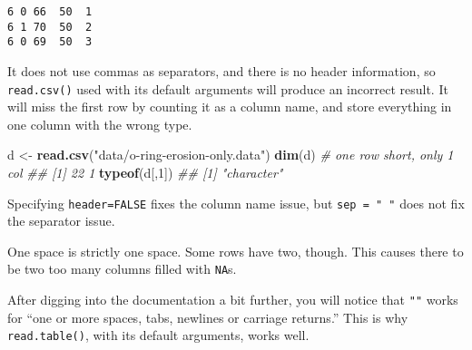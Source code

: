 \documentclass[12pt,krantz2]{krantz}
\makeatletter
\newenvironment{Shaded}{\begin{snugshade}}{\end{snugshade}}
\newcommand{\CommentTok}[1]{\textcolor[rgb]{0.37,0.37,0.37}{\textit{#1}}}
\newcommand{\DataTypeTok}[1]{\textcolor[rgb]{0.27,0.27,0.27}{#1}}
\newcommand{\DecValTok}[1]{\textcolor[rgb]{0.06,0.06,0.06}{#1}}
\newcommand{\KeywordTok}[1]{\textcolor[rgb]{0.27,0.27,0.27}{\textbf{#1}}}
\newcommand{\NormalTok}[1]{#1}
\newcommand{\OtherTok}[1]{\textcolor[rgb]{0.37,0.37,0.37}{#1}}
\newcommand{\StringTok}[1]{\textcolor[rgb]{0.5,0.5,0.5}{#1}}
\newenvironment{kframe}{%
\medskip{}
\setlength{\fboxsep}{.8em}
 \def\at@end@of@kframe{}%
 \ifinner\ifhmode%
  \def\at@end@of@kframe{\end{minipage}}%
  \begin{minipage}{\columnwidth}%
 \fi\fi%
 \def\FrameCommand##1{\hskip\@totalleftmargin \hskip-\fboxsep
 \colorbox{shadecolor}{##1}\hskip-\fboxsep
     \hskip-\linewidth \hskip-\@totalleftmargin \hskip\columnwidth}%
 \MakeFramed {\advance\hsize-\width
   \@totalleftmargin\z@ \linewidth\hsize
   \@setminipage}}%
 {\par\unskip\endMakeFramed%
 \at@end@of@kframe}
\renewenvironment{Shaded}{\begin{kframe}}{\end{kframe}}
\makeatother
\begin{document}
\begin{verbatim}
6 0 66  50  1
6 1 70  50  2
6 0 69  50  3
\end{verbatim}

It does not use commas as separators, and there is no header information, so \texttt{read.csv()} used with its default arguments will produce an incorrect result. It will miss the first row by counting it as a column name, and store everything in one column with the wrong type.

\begin{Shaded}
\begin{Highlighting}[]
\NormalTok{d <-}\StringTok{ }\KeywordTok{read.csv}\NormalTok{(}\StringTok{"data/o-ring-erosion-only.data"}\NormalTok{)}
\KeywordTok{dim}\NormalTok{(d) }\CommentTok{# one row short, only 1 col}
\CommentTok{## [1] 22  1}
\KeywordTok{typeof}\NormalTok{(d[,}\DecValTok{1}\NormalTok{])}
\CommentTok{## [1] "character"}
\end{Highlighting}
\end{Shaded}

Specifying \texttt{header=FALSE} fixes the column name issue, but \texttt{sep\ =\ "\ "} does not fix the separator issue.

\begin{Shaded}
\end{Shaded}

One space is strictly one space. Some rows have two, though. This causes there to be two too many columns filled with \texttt{NA}s.

After digging into the documentation a bit further, you will notice that \texttt{""} works for ``one or more spaces, tabs, newlines or carriage returns.'' This is why \texttt{read.table()}, with its default arguments, works well.
\end{document}
